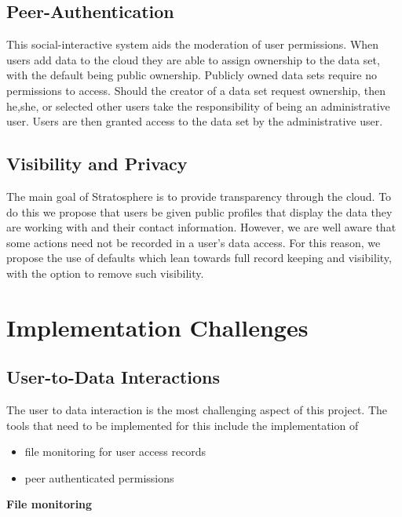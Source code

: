 \begin{multicols*}{2}

\subsection{Peer-Authentication}

This social-interactive system aids the moderation of user
permissions.  When users add data to the cloud they are able to assign
ownership to the data set, with the default being public
ownership. Publicly owned data sets require no permissions to access.
Should the creator of a data set request ownership, then he,she, or
selected other users take the responsibility of being an
administrative user.  Users are then granted access to the data set by
the administrative user.

\subsection{Visibility and Privacy}

The main goal of Stratosphere is to provide transparency through the
cloud. To do this we propose that users be given public profiles that
display the data they are working with and their contact information.
However, we are well aware that some actions need not be recorded in a
user's data access. For this reason, we propose the use of defaults
which lean towards full record keeping and visibility, with the option
to remove such visibility.

\section{Implementation Challenges}

\subsection{User-to-Data Interactions}

The user to data interaction is the most challenging aspect of this
project.  The tools that need to be implemented for this include the
implementation of
\begin{itemize}
\item file monitoring for user access records
\item peer authenticated permissions
\end{itemize}

\textbf{File monitoring}


\end{multicols*}
